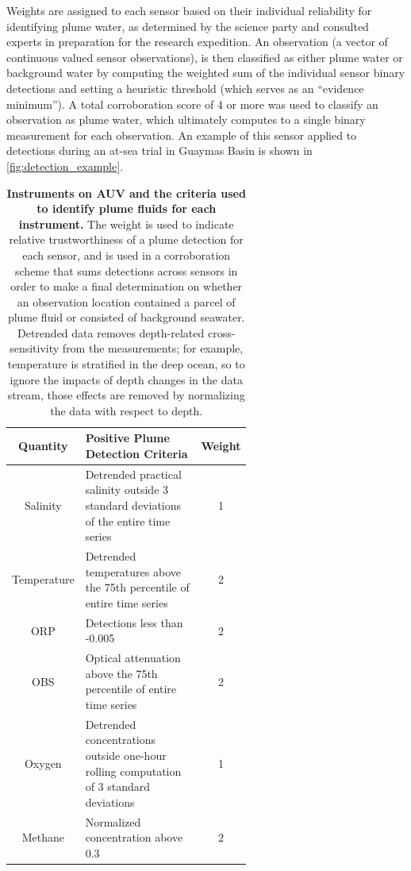 Weights are assigned to each sensor based on their individual reliability for identifying plume water, as determined by the science party and consulted experts in preparation for the research expedition. An observation (a vector of continuous valued sensor observations), is then classified as either plume water or background water by computing the weighted sum of the individual sensor binary detections and setting a heuristic threshold (which serves as an ``evidence minimum''). A total corroboration score of 4 or more was used to classify an observation as plume water, which ultimately computes to a single binary measurement for each observation. An example of this sensor applied to \Sentry detections during an at-sea trial in Guaymas Basin is shown in \cref{fig:detection_example}.

\begin{table}[h!]
    \centering
    \begin{tabular}{c|p{0.6\linewidth}|c}
        Quantity & Positive Plume Detection Criteria & Weight  \\
        \hline
        Salinity & Detrended practical salinity outside 3 standard deviations of the entire time series & 1 \\
        Temperature & Detrended temperatures above the 75th percentile of entire time series & 2 \\
        ORP & Detections less than -0.005 & 2 \\
        OBS & Optical attenuation above the 75th percentile of entire time series & 2 \\
        Oxygen & Detrended concentrations outside one-hour rolling computation of 3 standard deviations & 1 \\
        Methane & Normalized concentration above 0.3 & 2
    \end{tabular}
    \caption[Instruments on AUV \Sentry and the criteria used to identify plume fluids for each instrument.]{\textbf{Instruments on AUV \Sentry and the criteria used to identify plume fluids for each instrument.} The weight is used to indicate relative trustworthiness of a plume detection for each sensor, and is used in a corroboration scheme that sums detections across sensors in order to make a final determination on whether an observation location contained a parcel of plume fluid or consisted of background seawater. Detrended data removes depth-related cross-sensitivity from the measurements; for example, temperature is stratified in the deep ocean, so to ignore the impacts of depth changes in the data stream, those effects are removed by normalizing the data with respect to depth.}
    \label{tab:sentry_instruments}
\end{table}

